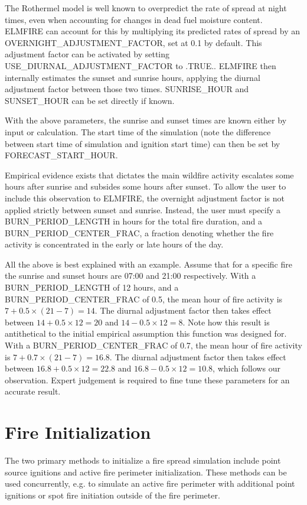 The Rothermel model is well known to overpredict the rate of spread at night times, even when accounting for changes in dead fuel moisture content. ELMFIRE can account for this by multiplying its predicted rates of spread by an OVERNIGHT\_ADJUSTMENT\_FACTOR, set at 0.1 by default. This adjustment factor can be activated by setting USE\_DIURNAL\_ADJUSTMENT\_FACTOR to .TRUE.. ELMFIRE then internally estimates the sunset and sunrise hours, applying the diurnal adjustment factor between those two times. SUNRISE\_HOUR and SUNSET\_HOUR can be set directly if known.

With the above parameters, the sunrise and sunset times are known either by input or calculation. The start time of the simulation (note the difference between start time of simulation and ignition start time) can then be set by FORECAST\_START\_HOUR. 

Empirical evidence exists that dictates the main wildfire activity escalates some hours after sunrise and subsides some hours after sunset. To allow the user to include this observation to ELMFIRE, the overnight adjustment factor is not applied strictly between sunset and sunrise. Instead, the user must specify a BURN\_PERIOD\_LENGTH in hours for the total fire duration, and a BURN\_PERIOD\_CENTER\_FRAC, a fraction denoting whether the fire activity is concentrated in the early or late hours of the day. 

All the above is best explained with an example. Assume that for a specific fire the sunrise and sunset hours are 07:00 and 21:00 respectively. With a BURN\_PERIOD\_LENGTH of 12 hours, and a BURN\_PERIOD\_CENTER\_FRAC of 0.5, the mean hour of fire activity is $7+0.5\times (21-7)=14$. The diurnal adjustment factor then takes effect between $14 +0.5\times 12 = 20$ and $14-0.5\times 12 = 8$. Note how this result is antithetical to the initial empirical assumption this function was designed for. With a BURN\_PERIOD\_CENTER\_FRAC of 0.7, the mean hour of fire activity is $7+0.7\times (21-7)=16.8$. The diurnal adjustment factor then takes effect between $16.8 +0.5\times 12 = 22.8$ and $16.8-0.5\times 12 = 10.8$, which follows our observation. Expert judgement is required to fine tune these parameters for an accurate result. 


\section{Fire Initialization}

The two primary methods to initialize a fire spread simulation include point source ignitions and active fire perimeter initialization. These methods can be used concurrently, e.g. to simulate an active fire perimeter with additional point ignitions or spot fire initiation outside of the fire perimeter.

